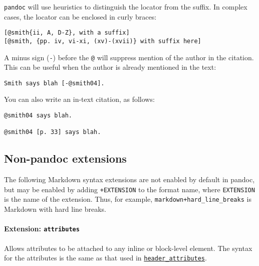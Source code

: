 \documentclass[]{article}
\begin{document}
\texttt{pandoc} will use heuristics to distinguish the locator from the
suffix. In complex cases, the locator can be enclosed in curly braces:

\begin{verbatim}
[@smith{ii, A, D-Z}, with a suffix]
[@smith, {pp. iv, vi-xi, (xv)-(xvii)} with suffix here]
\end{verbatim}

A minus sign (\texttt{-}) before the \texttt{@} will suppress mention of
the author in the citation. This can be useful when the author is
already mentioned in the text:

\begin{verbatim}
Smith says blah [-@smith04].
\end{verbatim}

You can also write an in-text citation, as follows:

\begin{verbatim}
@smith04 says blah.

@smith04 [p. 33] says blah.
\end{verbatim}

\hypertarget{non-pandoc-extensions}{%
\subsection{Non-pandoc extensions}\label{non-pandoc-extensions}}

The following Markdown syntax extensions are not enabled by default in
pandoc, but may be enabled by adding \texttt{+EXTENSION} to the format
name, where \texttt{EXTENSION} is the name of the extension. Thus, for
example, \texttt{markdown+hard\_line\_breaks} is Markdown with hard line
breaks.

\hypertarget{extension-attributes}{%
\paragraph{\texorpdfstring{Extension:
\texttt{attributes}}{Extension: attributes}}\label{extension-attributes}}

Allows attributes to be attached to any inline or block-level element.
The syntax for the attributes is the same as that used in
\protect\hyperlink{extension-header_attributes}{\texttt{header\_attributes}}.
\end{document}
